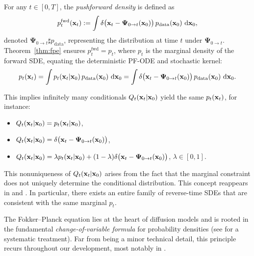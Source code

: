 For any $t\in[0,T]$, the \emph{pushforward density} is defined as
\[
p_t^{\mathrm{fwd}}({\mathbf{x}}_t) := \int \delta\bigl({\mathbf{x}}_t - {\bm{\Psi}}_{0 \to t}({\mathbf{x}}_0)\bigr)\, p_{\mathrm{data}}({\mathbf{x}}_0) \,\mathop{}\!\mathrm{d} {\mathbf{x}}_0,
\]
denoted $\bm{\Psi}_{0\to t} \sharp p_{\mathrm{data}}$, representing the distribution at time $t$ under $\bm{\Psi}_{0\to t}$. Theorem~\ref{thm:fpe} ensures $p_t^{\mathrm{fwd}} = p_t$, where $p_t$ is the marginal density of the forward SDE, equating the deterministic PF-ODE and stochastic kernel:
\[
p_t({\mathbf{x}}_t) = \int p_t({\mathbf{x}}_t |{\mathbf{x}}_0)\, p_{\mathrm{data}}({\mathbf{x}}_0)\,\mathop{}\!\mathrm{d} {\mathbf{x}}_0
= \int \delta\bigl({\mathbf{x}}_t - \bm{\Psi}_{0\to t}({\mathbf{x}}_0)\bigr)\, p_{\mathrm{data}}({\mathbf{x}}_0)\,\mathop{}\!\mathrm{d} {\mathbf{x}}_0.
\]

This implies infinitely many conditionals $Q_t({\mathbf{x}}_t |{\mathbf{x}}_0)$ yield the same $p_t({\mathbf{x}}_t)$, for instance:
\begin{itemize}
  \item {} $Q_t({\mathbf{x}}_t |{\mathbf{x}}_0) = p_t({\mathbf{x}}_t |{\mathbf{x}}_0)$,
  \item {} $Q_t({\mathbf{x}}_t |{\mathbf{x}}_0) = \delta\bigl({\mathbf{x}}_t - \bm{\Psi}_{0\to t}({\mathbf{x}}_0)\bigr)$,
  \item {} $Q_t({\mathbf{x}}_t |{\mathbf{x}}_0) = \lambda p_t({\mathbf{x}}_t |{\mathbf{x}}_0) + (1-\lambda)\delta\bigl({\mathbf{x}}_t - \bm{\Psi}_{0\to t}({\mathbf{x}}_0)\bigr)$, $\lambda\in[0,1]$.
\end{itemize}
This nonuniqueness of $Q_t({\mathbf{x}}_t |{\mathbf{x}}_0)$ arises from the fact that the marginal constraint does not uniquely determine the conditional distribution. This concept reappears in  and . In particular, there exists an entire family of reverse-time SDEs that are consistent with the same marginal $p_t$.

The Fokker–Planck equation lies at the heart of diffusion models and is rooted in the fundamental \emph{change-of-variable formula} for probability densities (see  for a systematic treatment). Far from being a minor technical detail, this principle recurs throughout our development, most notably in .



